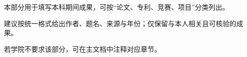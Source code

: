 \begin{publication}
本部分用于填写本科期间成果，可按“论文、专利、竞赛、项目”分类列出。

建议按统一格式给出作者、题名、来源与年份；仅保留与本人相关且可核验的成果。

若学院不要求该部分，可在主文档中注释对应章节。
\end{publication}
